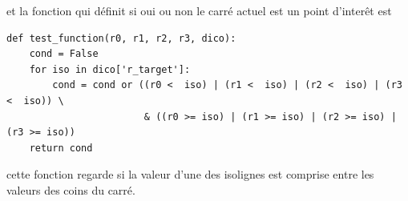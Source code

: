 \documentclass[french]{article}
\begin{document}
et la fonction qui définit si oui ou non le carré actuel est un point d'interêt est 

\begin{verbatim}
def test_function(r0, r1, r2, r3, dico):
    cond = False
    for iso in dico['r_target']:
        cond = cond or ((r0 <  iso) | (r1 <  iso) | (r2 <  iso) | (r3 <  iso)) \
                        & ((r0 >= iso) | (r1 >= iso) | (r2 >= iso) | (r3 >= iso))
    return cond
\end{verbatim}

cette fonction regarde si la valeur d'une des isolignes est comprise entre les valeurs des coins du carré.
\end{document}
